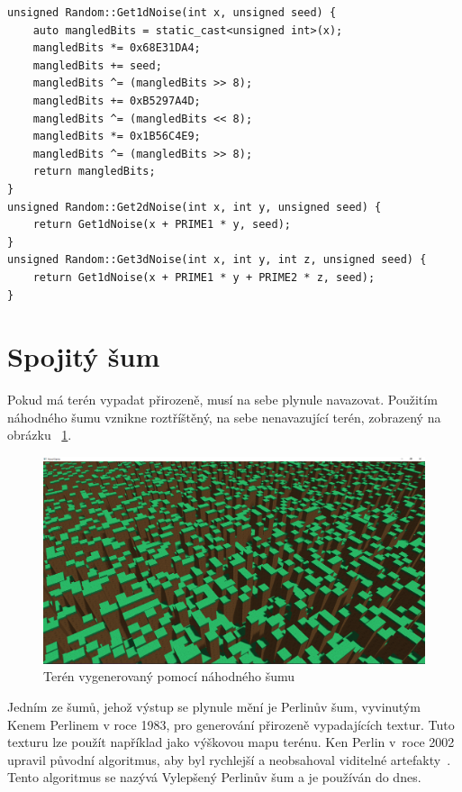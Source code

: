 \documentclass[thesis=M,czech]{FITthesis}[2019/12/23]
\begin{document}
\begin{verbatim}
unsigned Random::Get1dNoise(int x, unsigned seed) {
    auto mangledBits = static_cast<unsigned int>(x);
    mangledBits *= 0x68E31DA4;
    mangledBits += seed;
    mangledBits ^= (mangledBits >> 8);
    mangledBits += 0xB5297A4D;
    mangledBits ^= (mangledBits << 8);
    mangledBits *= 0x1B56C4E9;
    mangledBits ^= (mangledBits >> 8);
    return mangledBits;
}
unsigned Random::Get2dNoise(int x, int y, unsigned seed) {
    return Get1dNoise(x + PRIME1 * y, seed);
}
unsigned Random::Get3dNoise(int x, int y, int z, unsigned seed) {
    return Get1dNoise(x + PRIME1 * y + PRIME2 * z, seed);
}
\end{verbatim}

\section{Spojitý šum}

Pokud má terén vypadat přirozeně, musí na sebe plynule navazovat. Použitím náhodného šumu vznikne roztříštěný, na sebe nenavazující terén, zobrazený na obrázku ~\ref{fig:random_terrain}.

\begin{figure}\centering
	\includegraphics[width=\textwidth]{images/world_gen/random_terrain}
	\caption[Terén vygenerovaný pomocí náhodného šumu]{Terén vygenerovaný pomocí náhodného šumu}\label{fig:random_terrain}
\end{figure}

Jedním ze šumů, jehož výstup se plynule mění je Perlinův šum, vyvinutým Kenem Perlinem v roce 1983, pro generování přirozeně vypadajících textur. Tuto texturu lze použít například jako výškovou mapu terénu. Ken Perlin v~roce 2002 upravil původní algoritmus, aby byl rychlejší a neobsahoval viditelné artefakty~\cite{perlin_noise}. Tento algoritmus se nazývá Vylepšený Perlinův šum a je používán do dnes.
\end{document}
